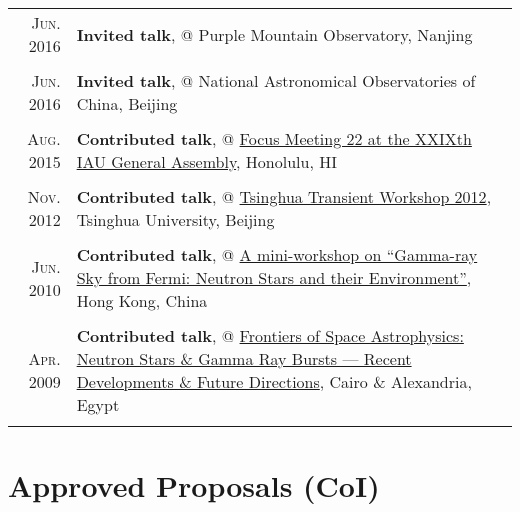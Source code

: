 \documentclass[letterpaper,10pt]{article}
\newcommand{\textwrap}{5.8in}       %
\begin{document}
\begin{longtable}{r|p{\textwrap}}
    \textsc{Jun. 2016}   &   \textbf{Invited talk}, @ Purple Mountain Observatory, Nanjing \\
    \multicolumn{2}{c}{} \\

    \textsc{Jun. 2016}   &   \textbf{Invited talk}, @ National Astronomical Observatories of China, Beijing   \\
    \multicolumn{2}{c}{} \\

    \textsc{Aug. 2015}   &   \textbf{Contributed talk}, @ \href{http://hffiau.epfl.ch/page-116896.html}{Focus Meeting 22 at the XXIXth IAU General Assembly}, Honolulu, HI     \\
    \multicolumn{2}{c}{} \\

    \textsc{Nov. 2012}   &   \textbf{Contributed talk}, @ \href{http://www.phys.tsinghua.edu.cn/publish/phy/5287/2012/20121102084855753317440/20121102084855753317440_.html}{Tsinghua Transient Workshop 2012}, Tsinghua University, Beijing   \\
    \multicolumn{2}{c}{} \\

    \textsc{Jun. 2010}   &   \textbf{Contributed talk}, @ \href{http://www.physics.hku.hk/~astro/2010Astro/Index.htm}{A mini-workshop on ``Gamma-ray Sky from Fermi: Neutron Stars and their Environment''}, Hong Kong, China  \\
    \multicolumn{2}{c}{} \\

    \textsc{Apr. 2009}   &   \textbf{Contributed talk}, @ \href{http://www.ns-grb.com/index0.html}{Frontiers of Space Astrophysics: Neutron Stars \& Gamma Ray Bursts --- Recent Developments \& Future Directions}, Cairo \& Alexandria, Egypt     \\
    \multicolumn{2}{c}{}

\end{longtable}
\endgroup


\section{Approved Proposals (CoI)}
\end{document}
